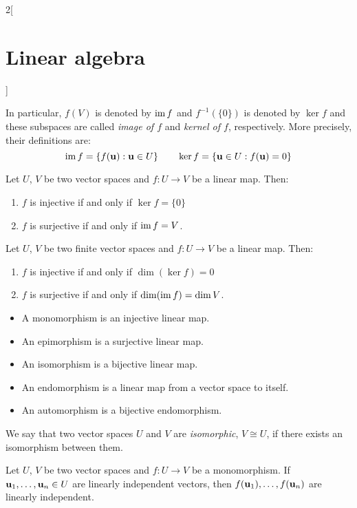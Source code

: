 \documentclass[../../../main.tex]{subfiles}
\begin{document}
\begin{multicols}{2}[\section{Linear algebra}]
\begin{prop}
\begin{enumerate}
    \end{enumerate}
    In particular, $f(V)$ is denoted by $\operatorname{im} f$ and $f^{-1}(\{0\})$ is denoted by $\ker f$ and these subspaces are called \textit{image of $f$} and \textit{kernel of $f$}, respectively. More precisely, their definitions are:
    $$\operatorname{im} f=\{f(\vb{u}): \vb{u}\in U\}\qquad\ker f=\{\vb{u}\in U: f(\vb{u})=0\}$$
  \end{prop}
  \begin{prop}
    Let $U$, $V$ be two vector spaces and $f:U\rightarrow V$ be a linear map. Then:
    \begin{enumerate}
      \item $f$ is injective if and only if $\ker f=\{0\}$
      \item $f$ is surjective if and only if $\operatorname{im} f=V$.
    \end{enumerate}
  \end{prop}
  \begin{corollary}
    Let $U$, $V$ be two finite vector spaces and $f:U\rightarrow V$ be a linear map. Then:
    \begin{enumerate}
      \item $f$ is injective if and only if $\dim(\ker f)=0$
      \item $f$ is surjective if and only if $\dim(\operatorname{im} f)=\dim V$.
    \end{enumerate}
  \end{corollary}
  \begin{definition}
    \hfill
    \begin{itemize}
      \item A monomorphism is an injective linear map.
      \item An epimorphism is a surjective linear map.
      \item An isomorphism is a bijective linear map.
      \item An endomorphism is a linear map from a vector space to itself.
      \item An automorphism is a bijective endomorphism.
    \end{itemize}
  \end{definition}
  \begin{definition}
    We say that two vector spaces $U$ and $V$ are \textit{isomorphic}, $V\cong U$, if there exists an isomorphism between them.
  \end{definition}
  \begin{prop}
    Let $U$, $V$ be two vector spaces and $f:U\rightarrow V$ be a monomorphism. If $\vb{u}_1,\ldots,\vb{u}_n\in U$ are linearly independent vectors, then $f(\vb{u}_1),\ldots,f(\vb{u}_n)$  are linearly independent.

\end{prop}
\end{multicols}
\end{document}
